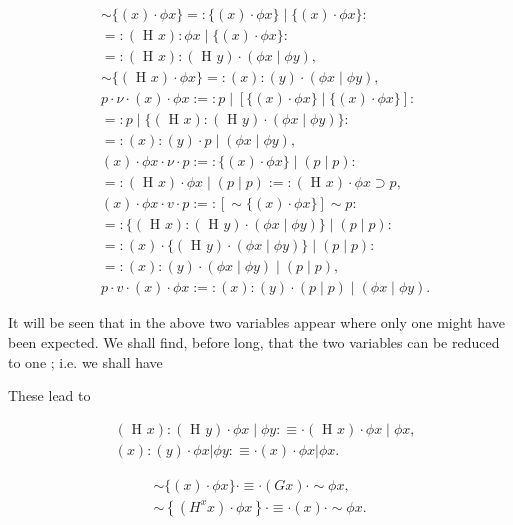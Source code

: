 \documentclass[10pt]{article}
\begin{document}
$$
\begin{aligned}
& \sim\{(x) \cdot \phi x\}=:\{(x) \cdot \phi x\} \mid\{(x) \cdot \phi x\}: \\
&=:(\text { H } x): \phi x \mid\{(x) \cdot \phi x\}: \\
&=:(\text { H } x):(\text { H } y) \cdot(\phi x \mid \phi y), \\
& \sim\{(\text { H } x) \cdot \phi x\}=:(x):(y) \cdot(\phi x \mid \phi y), \\
& p \cdot \nu \cdot(x) \cdot \phi x:=: p \mid[\{(x) \cdot \phi x\} \mid\{(x) \cdot \phi x\}]: \\
&=: p \mid\{(\text { H } x):(\text { H } y) \cdot(\phi x \mid \phi y)\}: \\
&=:(x):(y) \cdot p \mid(\phi x \mid \phi y), \\
&(x) \cdot \phi x \cdot \nu \cdot p:=:\{(x) \cdot \phi x\} \mid(p \mid p): \\
&=:(\text { H } x) \cdot \phi x \mid(p \mid p):=:(\text { H } x) \cdot \phi x \supset p, \\
&(x) \cdot \phi x \cdot v \cdot p:=:[\sim\{(x) \cdot \phi x\}] \sim p: \\
&=:\{(\text { H } x):(\text { H } y) \cdot(\phi x \mid \phi y)\} \mid(p \mid p): \\
&=:(x) \cdot\{(\text { H } y) \cdot(\phi x \mid \phi y)\} \mid(p \mid p): \\
&=:(x):(y) \cdot(\phi x \mid \phi y) \mid(p \mid p), \\
& p \cdot v \cdot(x) \cdot \phi x:=:(x):(y) \cdot(p \mid p) \mid(\phi x \mid \phi y) .
\end{aligned}
$$

It will be seen that in the above two variables appear where only one might have been expected. We shall find, before long, that the two variables can be reduced to one ; i.e. we shall have

These lead to

$$
\begin{aligned}
& (\text { H } x):(\text { H } y) \cdot \phi x \mid \phi y: \equiv \cdot(\text { H } x) \cdot \phi x \mid \phi x, \\
& (x):(y) \cdot \phi x|\phi y: \equiv \cdot(x) \cdot \phi x| \phi x .
\end{aligned}
$$

$$
\begin{aligned}
\sim\{(x) \cdot \phi x\} \cdot \equiv \cdot(G x) \cdot \sim \phi x, \\
\sim\left\{\left(H^{x} x\right) \cdot \phi x\right\} \cdot \equiv \cdot(x) \cdot \sim \phi x .
\end{aligned}
$$
\end{document}
